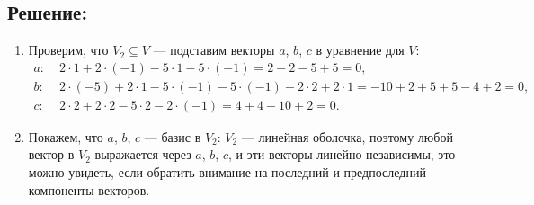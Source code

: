 \documentclass[12pt]{article}
\begin{document}
    \subsection*{Решение:}
    \begin{enumerate}
        \item
        Проверим, что $V_2 \subseteq V$ --- подставим векторы $a$, $b$, $c$ в уравнение для $V$:
        \begin{align*}
            a: & \; 2 \cdot 1 + 2 \cdot (-1) - 5 \cdot 1 - 5 \cdot (-1) = 2 - 2 - 5 + 5 = 0, \\
            b: & \; 2 \cdot (-5) + 2 \cdot 1 - 5 \cdot (-1) - 5 \cdot (-1) - 2 \cdot 2 + 2 \cdot 1 = -10 + 2 + 5 + 5 - 4 + 2 = 0, \\
            c: & \; 2 \cdot 2 + 2 \cdot 2 - 5 \cdot 2 - 2 \cdot (-1) = 4 + 4 - 10 + 2 = 0 .
        \end{align*}

        \item
        Покажем, что $a$, $b$, $c$ --- базис в $V_2$: $V_2$ --- линейная оболочка, поэтому любой вектор в $V_2$ выражается через $a$, $b$, $c$, и эти векторы линейно независимы,
        это можно увидеть, если обратить внимание на последний и предпоследний компоненты векторов.


\end{enumerate}
\end{document}
